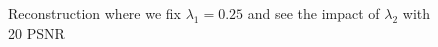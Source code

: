 \documentclass[a4paper,11pt,oneside]{report}
\theoremstyle{named}
\begin{document}
\begin{figure}
    \centering
    \caption{Reconstruction where we fix $\lambda_1 = 0.25$ and see the impact of $\lambda_2$ with 20 PSNR}
    \label{fig:20 lossl1 rec}
\end{figure}
\end{document}
